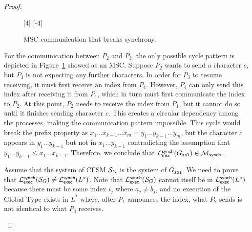 \begin{proof}
\begin{itemize}
\begin{figure}[!ht]
\begin{msc}[draw frame=none, draw head=none, msc keyword=, head height=0px, label distance=0.5ex, foot height=0px, foot distance=0px]{}
				      [4]%
				      \nextlevel
				      \nextlevel
				      [-4]
			      \end{msc}
			      \caption{MSC communication that breaks synchrony.} %
			      \label{fig:cycle2}
		      \end{figure}

		      For the communication between $P_2$ and $P_3$, the only possible cycle
		      pattern is depicted in Figure~\ref{fig:cycle2} showed as an MSC.
		      Suppose $P_2$ wants to send a character $c$, but $P_3$
		      is not expecting any further characters. In order for
		      $P_3$ to resume receiving, it must first receive an index
		      from $P_4$. However, $P_4$ can only send this index
		      after receiving it from $P_1$, which in turn must first
		      communicate the index to $P_2$.
		      At this point, $P_2$ needs to receive the index from
		      $P_1$, but it cannot do so until it finishes sending
		      character $c$. This creates a circular dependency among the
		      processes, making the communication pattern impossible. %
		      This cycle would break the prefix property as
		      $x_1...x_{k-1}...x_m= y_1...y_{k-1}...y_m$, but the character $c$ appears
		      in $y_1...y_{k-1}$ but not in $x_1...y_{k-1}$ contradicting the
		      assumption that $y_1...y_{k-1} \leq x_1...x_{k-1}$.
		      Therefore, we conclude that 
			  $\mathcal{L}_{\mathsf{msc}}^{\mathsf{synch}}(G_{\texttt{sol}}) \in \mathcal{M}_{\mathsf{synch}}$.

			  Assume that the system of CFSM $\mathcal{S}_G$ is the system of $G_{\texttt{sol}}$.
			  We need to prove that 	
			  $\mathcal{L}_{\mathsf{exec}}^{\mathsf{synch}}(\mathcal{S}_G) \neq \mathcal{L}_{\mathsf{exec}}^{\mathsf{synch}}(L^*)$.
		      Note that $\mathcal{L}_{\mathsf{exec}}^{\mathsf{synch}}(\mathcal{S}_G)$ cannot 
			  itself be in $\mathcal{L}_{\mathsf{exec}}^{\mathsf{synch}}(L^*)$ because there must be
		      some index $i_j$ where $a_j \neq b_j$, and no execution of the Global 
			  Type exists in $L^*$ where,
		      after $P_1$ announces the index, what $P_2$ sends is not
		      identical to what $P_3$ receives.


\end{itemize}
\end{proof}
